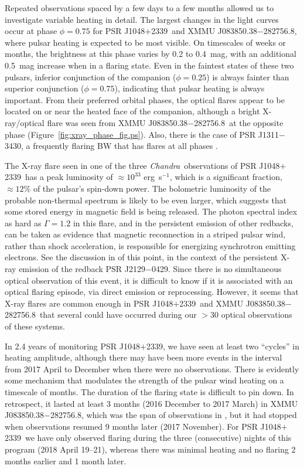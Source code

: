 \documentclass[iop]{emulateapj}
\newcommand{\chandra}{{\it Chandra}}
\newcommand{\msptwo}{PSR J1048$+$2339}
\newcommand{\mspthree}{XMMU J083850.38$-$282756.8}
\begin{document}
Repeated observations spaced by a few days to a few months allowed
us to investigate variable heating in detail. The largest changes
in the light curves occur at phase $\phi=0.75$ for \msptwo\ and \mspthree,
where pulsar heating is expected to be most visible.
On timescales of weeks or months, the brightness at this phase varies
by 0.2 to 0.4~mag, with an additional 0.5~mag increase when in a
flaring state.  Even in the faintest states of these two pulsars,
inferior conjunction of the companion ($\phi=0.25$) is always fainter
than superior conjunction ($\phi=0.75$),
indicating that pulsar heating is always important.  
From their preferred orbital phases, the optical flares appear to be located
on or near the heated face of the companion,
although a bright X-ray/optical flare was seen from \mspthree\ at the
opposite phase (Figure~\ref{fig:xray_phase_fig.ps}).  Also, there is
the case of PSR J1311$-$3430, a frequently flaring BW
that has flares at all phases \citep{an17}.

The X-ray flare seen in one of the three \chandra\ observations
of \msptwo\ has a peak luminosity of $\approx10^{33}$ erg~s$^{-1}$,
which is a significant fraction, $\approx12\%$ of the pulsar's spin-down power. 
The bolometric luminosity of the probable non-thermal spectrum is likely
to be even larger, which suggests that some stored energy in
magnetic field is being released.  The photon spectral index as
hard as $\Gamma=1.2$ in this flare, and in the persistent
emission of other redbacks, can
be taken as evidence that magnetic reconnection in a striped
pulsar wind, rather than shock acceleration, is responsible for
energizing synchrotron emitting electrons.
See the discussion in \citet{aln18} of this point, in the context
of the persistent X-ray emission of the redback PSR J2129$-$0429.
Since there is no simultaneous optical observation of this event,
it is difficult to know if it is associated with an optical flaring
episode, via direct emission or reprocessing.  However,
it seems that X-ray flares are common enough
in \msptwo\ and \mspthree\ that several could have occurred
during our $>30$ optical observations of these systems.

In 2.4 years of monitoring \msptwo, we have seen at least
two ``cycles'' in heating amplitude, although there may have been
more events in the interval from 2017 April to December when there were
no observations.  There is evidently some mechanism that modulates
the strength of the pulsar wind heating on a timescale of months.
The duration of the flaring state is difficult to pin down.  In
retrospect, it lasted at least 3 months (2016 December to 2017 March)
in \mspthree, which was the span of observations in \citet{hal17b},
but it had stopped when observations resumed 9 months later (2017 November).
For \msptwo\ we have only observed flaring during the three
(consecutive) nights of this program (2018 April 19--21), whereas there
was minimal heating and no flaring 2 months earlier and 1 month later.
\end{document}
